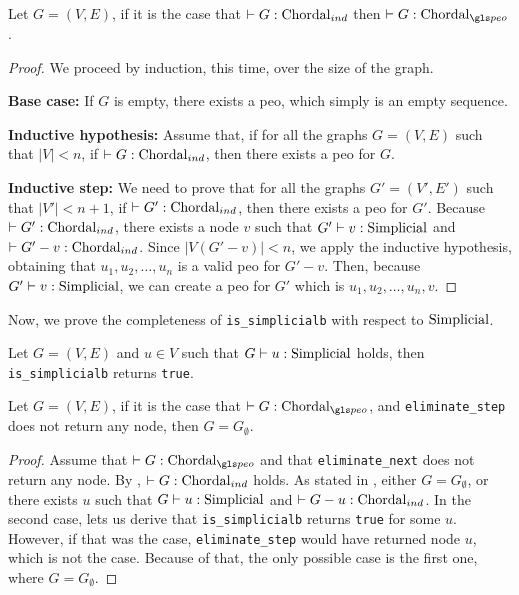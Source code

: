 \begin{lemma}\label{lem:chordal21}
    Let $G = (V, E)$, if it is the case that $\chordalind{G}$ then $\chordalpeo{G}$.
\end{lemma}
\begin{proof}
    We proceed by induction, this time, over the size of the graph.

    \textbf{Base case:}
    If $G$ is empty, there exists a \gls{peo}, which simply is an empty sequence.

    \medskip

    \textbf{Inductive hypothesis:}
    Assume that, if for all the graphs $G = (V, E)$ such that $|V| < n$, if $\chordalind{G}$, then there exists a \gls{peo} for $G$.

    \medskip

    \textbf{Inductive step:}
    We need to prove that for all the graphs $G' = (V', E')$ such that $|V'| < n+1$, if $\chordalind{G'}$, then there exists a \gls{peo} for $G'$.
    Because $\chordalind{G'}$, there exists a node $v$ such that $\simplicial{v}{G'}$ and $\chordalind{G' - v}$. Since $|V(G' - v)| < n$, we apply the inductive hypothesis, obtaining that $u_1, u_2, \dots, u_n$ is a valid \gls{peo} for $G' - v$. Then, because $\simplicial{v}{G'}$, we can create a \gls{peo} for $G'$ which is $u_1, u_2, \dots, u_n, v$.
\end{proof}

Now, we prove the completeness of \texttt{is\_simplicialb} with respect to $\simplicialsymbol$.

\begin{lemma}\label{lem:sbcomp}
Let $G = (V, E)$ and $u \in V$ such that $\simplicial{u}{G}$ holds, then \texttt{is\_simplicialb} returns \texttt{true}. \Coqed
\end{lemma}

\begin{lemma}\label{lem:inv-elim-2}
    Let $G = (V, E)$, if it is the case that $\chordalpeo{G}$, and \texttt{eliminate\_step} does not return any node, then $G = G_\emptyset$. \Coqed
\end{lemma}
\begin{proof}
    Assume that $\chordalpeo{G}$ and that \texttt{eliminate\_next} does not return any node. By , $\chordalind{G}$ holds. As stated in , either $G = G_\emptyset$, or there exists $u$ such that $\simplicial{u}{G}$ and $\chordalind{G - u}$. In the second case,  lets us derive that \texttt{is\_simplicialb} returns \texttt{true} for some $u$. However, if that was the case, \texttt{eliminate\_step} would have returned node $u$, which is not the case. Because of that, the only possible case is the first one, where $G = G_\emptyset$.
\end{proof}

